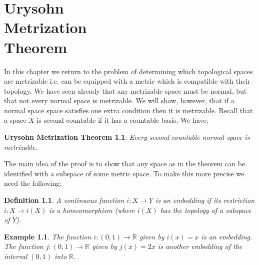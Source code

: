 \documentclass[11pt, letterpaper, oneside]{report}
\theoremstyle{pplain}
\newtheorem{ITERMVALUE THM}[theorem]{Intermediate Value Theorem}
\newtheorem{HEINEBOREL THM}[theorem]{Heine-Borel Theorem}
\newtheorem{UMETR THM}[theorem]{Urysohn Metrization Theorem}
\newtheorem{UMETR2 THM}[theorem]{Urysohn Metrization Theorem (v.2)}
\theoremstyle{ddefinition}
\newtheorem{definition}[theorem]{Definition}
\newtheorem{example}[theorem]{Example}
\theoremstyle{nnn}
\newtheorem{TDA NN}[theorem]{Topological Data Analysis. }
\theoremstyle{eexercise}
\newcommand{\R}{{\mathbb R}}
\begin{document}
\newpage

\chapter[Urysohn Metrization Theorem]{Urysohn \\ Metrization \\ Theorem}

\thispagestyle{firststyle}
  
  
  

In this chapter we  return to the problem of determining which topological spaces
are metrizable i.e. can be equipped with a metric which is compatible with their topology.  
We have seen already that any metrizable space must be normal, but that not every normal space is metrizable. 
We will show, however,  that if a normal space space satisfies one extra condition then it is  metrizable. 
Recall that a space $X$ is second countable if it has a countable basis. We have:

\begin{UMETR THM}  
\label{NORMAL URYSOHN METR THM}
Every second countable normal space is metrizable.   
\end{UMETR THM}

The main idea of the proof is to show that any space as in the theorem can be identified 
with a subspace of some metric space. To make this more precise we need the following: 

\begin{definition}
\label{EMBEDDING DEF}
A continuous function $i\colon X\to Y$ is an \emph{embedding} if  its restriction 
$i\colon X \to i(X)$ is a homeomorphism (where $i(X)$ has the topology of a subspace of $Y$).  
\end{definition}

\begin{example}
The function $i\colon (0, 1) \to \R$ given by $i(x)= x$ is an embedding. The function 
$j\colon (0, 1) \to \R$ given by $j(x) = 2x$ is another embedding  of the interval 
$(0, 1)$ into $\R$.
\end{example}
\end{document}
